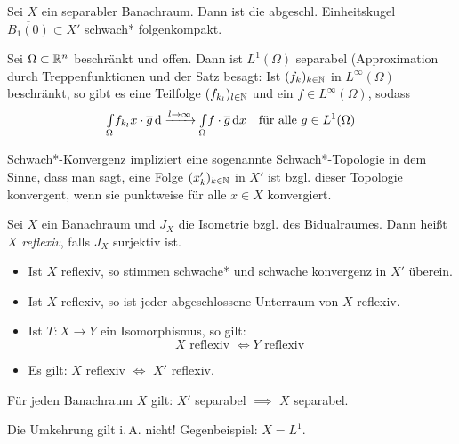 \documentclass{cheat-sheet}
\newcommand{\IntO}[2]{\Int{\Omega}{}{#1}{#2}} %
\begin{document}
\begin{satz}
  Sei $X$ ein separabler Banachraum. Dann ist die abgeschl. Einheitskugel $\overline{B_1(0)} \subset X'$ schwach* folgenkompakt.
\end{satz}

\begin{bsp}
  Sei $\Omega \subset \mathbb{R}^n$ beschränkt und offen. Dann ist $L^1(\Omega)$ separabel (Approximation durch Treppenfunktionen und der Satz besagt: Ist $(f_k)_{k \in \mathbb{N}}$ in $L^{\infty}(\Omega)$ beschränkt, so gibt es eine Teilfolge $(f_{k_l})_{l \in \mathbb{N}}$ und ein $f \in L^\infty(\Omega)$, sodass
  \[ \IntO{f_{k_l}{x} \cdot \overline{g}} \xrightarrow{l \to \infty} \IntO{f \cdot \overline{g}}{x} \quad \text{für alle $g \in L^1(\Omega)$} \]
\end{bsp}

\begin{bem}
  Schwach*-Konvergenz impliziert eine sogenannte Schwach*-Topologie in dem Sinne, dass man sagt, eine Folge $(x_k')_{k \in \mathbb{N}}$ in $X'$ ist bzgl. dieser Topologie konvergent, wenn sie punktweise für alle $x \in X$ konvergiert.
\end{bem}

\begin{defn}
  Sei $X$ ein Banachraum und $J_X$ die Isometrie bzgl. des Bidualraumes. Dann heißt $X$ \emph{reflexiv}, falls $J_X$ surjektiv ist.
\end{defn}

\begin{lem}
  \begin{itemize}
    \item Ist $X$ reflexiv, so stimmen schwache* und schwache konvergenz in $X'$ überein.
    \item Ist $X$ reflexiv, so ist jeder abgeschlossene Unterraum von $X$ reflexiv.
    \item Ist $T : X \to Y$ ein Isomorphismus, so gilt:
      \[ X \text{ reflexiv } \iff Y \text{ reflexiv } \]
    \item Es gilt: $X$ reflexiv $\iff$ $X'$ reflexiv.
  \end{itemize}
\end{lem}

\begin{lem}
  Für jeden Banachraum $X$ gilt: $X'$ separabel $\implies$ $X$ separabel.
\end{lem}

\begin{bem}
  Die Umkehrung gilt i.\,A. nicht! Gegenbeispiel: $X = L^1$.
\end{bem}
\end{document}
